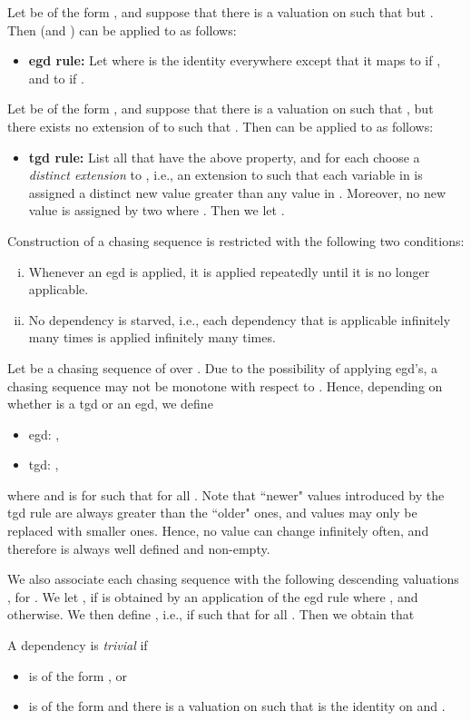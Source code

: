 \documentclass[envcountset]{llncs}
\begin{document}
Let  be of the form , and  suppose that there is a valuation  on  such that  but . Then  (and ) can be applied to  as follows:
\begin{itemize}
\item \textbf{egd rule:}  Let  where  is the identity everywhere except that it maps  to  if , and  to  if .
\end{itemize}
Let  be of the form , and suppose that there is a valuation  on  such that , but there exists no extension  of  to  such that . Then   can be applied to  as follows:
\begin{itemize}
\item \textbf{tgd rule:}  List all  that have the above property, and for each  choose a \emph{distinct extension} to , i.e., an extension  to  such that each variable in  is assigned a distinct new value greater than any value in . Moreover, no new value is assigned by two  where . Then we let .
\end{itemize}

Construction of a chasing sequence is restricted with the following two conditions:
\begin{enumerate}[(i)]
\item Whenever an egd is applied, it is applied repeatedly until it is no longer applicable.
\item No dependency is starved, i.e., each dependency that is applicable infinitely many times is applied infinitely many times.
\end{enumerate}
Let  be a chasing sequence of  over . Due to the possibility of applying egd's, a chasing sequence may not be monotone with respect to . Hence, depending on whether  is a tgd or an egd, we define
\begin{itemize}
\item egd: ,
\item tgd: ,
\end{itemize}
where  and  is  for  such that  for all . Note that ``newer" values introduced by the tgd rule are always greater than the ``older" ones, and values may only be replaced  with smaller ones. Hence, no value can change infinitely often, and therefore  is always well defined and non-empty.

We also associate each chasing sequence with the following descending valuations , for . We let  ,  if  is obtained by an application of the egd rule where , and  otherwise. We then define , i.e.,  if  such that  for all . Then we obtain that 


A dependency  is \emph{trivial} if
\begin{itemize}
\item  is of the form , or
\item  is of the form  and there is a valuation  on  such that  is the identity on  and .
\end{itemize}
\end{document}
